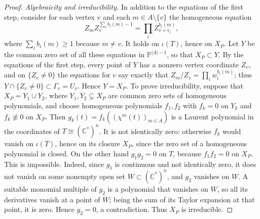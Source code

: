 \begin{proof}
\emph{Algebraicity and irreducibility.} In addition to the equations of the first step, consider for each vertex $v$ and each $m\in A\setminus\{v\}$ the homogeneous equation
\[
 Z_m Z_v^{\sum_i b_i(m)-1}=\prod_i Z_{v+e_i}^{b_i(m)},
\]
where $\sum_ib_i(m)\geq1$ because $m\neq v$. It holds on $\iota(T)$, hence on $X_P$. Let $Y$ be the common zero set of all these equations in $\mathbb P^{|A|-1}$, so that $X_P\subset Y$. By the equations of the first step, every point of $Y$ has a nonzero vertex coordinate $Z_v$, and on $\{Z_v\neq0\}$ the equations for $v$ say exactly that $Z_m/Z_v=\prod_iw_i^{b_i(m)}$; thus $Y\cap\{Z_v\neq0\}\subset\Gamma_v=U_v$. Hence $Y=X_P$. To prove irreducibility, suppose that $X_P=Y_1\cup Y_2$, where $Y_1,Y_2\subsetneq X_P$ are common zero sets of homogeneous polynomials, and choose homogeneous polynomials $f_1,f_2$ with $f_k=0$ on $Y_k$ and $f_k\not\equiv0$ on $X_P$. Then $g_k(t)=f_k((\chi^m(t))_{m\in A})$ is a Laurent polynomial in the coordinates of $T\cong(\mathbb C^*)^n$. It is not identically zero: otherwise $f_k$ would vanish on $\iota(T)$, hence on its closure $X_P$, since the zero set of a homogeneous polynomial is closed. On the other hand $g_1g_2=0$ on $T$, because $f_1f_2=0$ on $X_P$. This is impossible. Indeed, since $g_1$ is continuous and not identically zero, it does not vanish on some nonempty open set $W\subset(\mathbb C^*)^n$, and $g_2$ vanishes on $W$. A suitable monomial multiple of $g_2$ is a polynomial that vanishes on $W$, so all its derivatives vanish at a point of $W$; being the sum of its Taylor expansion at that point, it is zero. Hence $g_2=0$, a contradiction. Thus $X_P$ is irreducible.


\end{proof}
